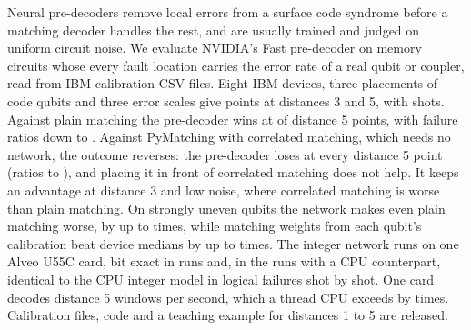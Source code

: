 Neural pre-decoders remove local errors from a surface code syndrome before a matching decoder handles the rest, and
are usually trained and judged on uniform circuit noise. We evaluate NVIDIA's Fast pre-decoder on
memory circuits whose every fault location carries the error rate of a real qubit or coupler, read from IBM
calibration CSV files. Eight IBM devices, three placements of code qubits and three error scales give
\NumPoints{} points at distances 3 and 5, with \TotalShots{} shots. Against plain matching the pre-decoder wins at \PmFiveBetter{} of \PmFiveN{} distance 5 points, with failure ratios down to \PmFiveMin{}. Against
PyMatching with correlated matching, which needs no network, the outcome reverses: the pre-decoder loses at every
distance 5 point (ratios \CorrFiveMin{} to \CorrFiveMax{}), and placing it in front of correlated matching does not
help. It keeps an advantage at distance 3 and low noise, where correlated matching is worse than plain matching. On
strongly uneven qubits the network makes even plain matching worse, by up to \KingScreenMax{} times, while matching
weights from each qubit's calibration beat device medians by up to \MedWeightsMax{} times. The integer network runs
on one Alveo U55C card, bit exact in \CardAllExact{} \CardConfigs{} runs and, in the \CardCompared{} runs with a CPU counterpart,
identical to the CPU integer model in logical failures shot by shot. One card decodes \CardRateDf{} distance 5 windows per second, which a
\CpuThreads{} thread CPU exceeds by \CpuOverCardDf{} times. Calibration files, code and a teaching example for
distances 1 to 5 are released.
